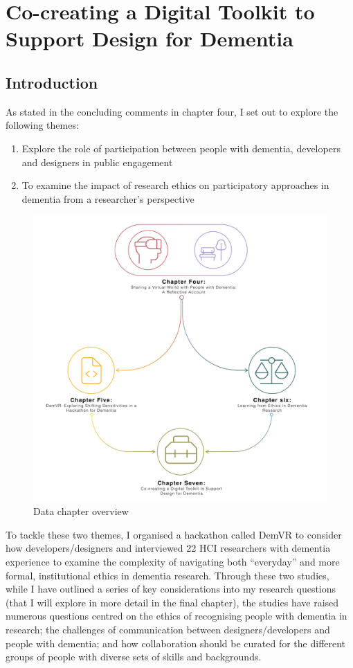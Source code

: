 \chapter{Co-creating a Digital Toolkit to Support Design for Dementia}
\label{D3}

\section{Introduction}
\label{D3:intro}
As stated in the concluding comments in chapter four, I set out to explore the following themes:
\begin{enumerate}
    \item Explore the role of participation between people with dementia, developers and designers in public engagement 
    \item To examine the impact of research ethics on participatory approaches in dementia from a researcher's perspective
\end{enumerate}

\begin{figure}[htp]
\centering
\includegraphics[width=0.6\linewidth]{Images/Thesis_Narrative/Narrative_Full.png}
\caption{Data chapter overview}
\label{fig:Thesis_Overview}
\end{figure}

To tackle these two themes, I organised a hackathon called DemVR to consider how developers/designers and interviewed 22 HCI researchers with dementia experience to examine the complexity of navigating both “everyday” and more formal, institutional ethics in dementia research. Through these two studies, while I have outlined a series of key considerations into my research questions (that I will explore in more detail in the final chapter), the studies have raised numerous questions centred on the ethics of recognising people with dementia in research; the challenges of communication between designers/developers and people with dementia; and how collaboration should be curated for the different groups of people with diverse sets of skills and backgrounds. 

